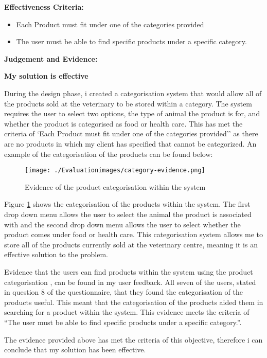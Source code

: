 \textbf{Effectiveness Criteria:}\newline
\begin{itemize}
	\item{Each Product must fit under one of the categories provided}
	\item{The user must be able to find specific products under a specific category.}
\end{itemize}
\textbf{Judgement and Evidence:} \newline

\textbf{\large{My solution is effective}}

During the design phase, i created a categorisation system that would allow all of the products sold at the veterinary to be stored within a category. The system requires the user to select two options, the type of animal the product is for, and whether the product is categorised as food or health care. This has met the criteria of `Each Product must fit under one of the categories provided'' as there are no products in which my client has specified that cannot be categorized. An example of the categorisation of the products can be found below:

\begin{figure}[H]
\caption{Evidence of the product categorisation within the system} \label{category}
\hfill\texttt{[image: ./Evaluationimages/category-evidence.png]}
\end{figure}

Figure \ref{category} shows the categorisation of the products within the system. The first drop down menu allows the user to select the animal the product is associated with and the second drop down menu allows the user to select whether the product comes under food or health care. This categorisation system allows me to store all of the products currently sold at the veterinary centre, meaning it is an effective solution to the problem.

Evidence that the users can find products within the system using the product categorisation , can be found in my user feedback. All seven of the users, stated in question 8 of the questionnaire, that they found the categorisation of the products useful. This meant that the categorisation of the products aided them in searching for a product within the system. This evidence meets the criteria of ``The user must be able to find specific products under a specific category.''.

The evidence provided above has met the criteria of this objective, therefore i can conclude that my solution has been effective.







